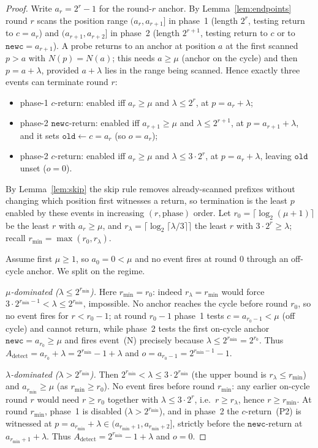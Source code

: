 \documentclass[11pt]{article}
\newcommand{\oldc}{\texttt{old}}
\newcommand{\newc}{\texttt{newc}}
\begin{document}
\begin{proof}
Write $a_r=2^{r}-1$ for the round-$r$ anchor. By Lemma~\ref{lem:endpoints} round
$r$ scans the position range $(a_r,a_{r+1}]$ in phase~1 (length $2^{r}$, testing
return to $c=a_r$) and $(a_{r+1},a_{r+2}]$ in phase~2 (length $2^{r+1}$, testing
return to $c$ or to $\newc=a_{r+1}$). A probe returns to an anchor at position
$a$ at the first scanned $p>a$ with $N(p)=N(a)$; this needs $a\ge\mu$ (anchor on
the cycle) and then $p=a+\lambda$, provided $a+\lambda$ lies in the range being
scanned. Hence exactly three events can terminate round $r$:
\begin{itemize}[leftmargin=2.4em,itemsep=1pt]
\item[\textup{(P1)}] phase-1 $c$-return: enabled iff $a_r\ge\mu$ and
      $\lambda\le 2^{r}$, at $p=a_r+\lambda$;
\item[\textup{(N)}] phase-2 $\newc$-return: enabled iff $a_{r+1}\ge\mu$ and
      $\lambda\le 2^{r+1}$, at $p=a_{r+1}+\lambda$, and it sets $\oldc\gets c=a_r$
      (so $o=a_r$);
\item[\textup{(P2)}] phase-2 $c$-return: enabled iff $a_r\ge\mu$ and
      $\lambda\le 3\cdot2^{r}$, at $p=a_r+\lambda$, leaving $\oldc$ unset ($o=0$).
\end{itemize}
By Lemma~\ref{lem:skip} the skip rule removes already-scanned prefixes without
changing which position first witnesses a return, so termination is the least $p$
enabled by these events in increasing $(r,\text{phase})$ order. Let
$r_0=\lceil\log_2(\mu+1)\rceil$ be the least $r$ with $a_r\ge\mu$, and
$r_\lambda=\lceil\log_2\lceil\lambda/3\rceil\rceil$ the least $r$ with
$3\cdot2^{r}\ge\lambda$; recall $r_{\min}=\max(r_0,r_\lambda)$.

Assume first $\mu\ge1$, so $a_0=0<\mu$ and no event fires at round $0$ through an
off-cycle anchor. We split on the regime.

\emph{$\mu$-dominated ($\lambda\le 2^{r_{\min}}$).} Here $r_{\min}=r_0$: indeed
$r_\lambda=r_{\min}$ would force $3\cdot2^{r_{\min}-1}<\lambda\le 2^{r_{\min}}$,
impossible. No anchor reaches the cycle before round $r_0$, so no event fires for
$r<r_0-1$; at round $r_0-1$ phase~1 tests $c=a_{r_0-1}<\mu$ (off cycle) and cannot
return, while phase~2 tests the first on-cycle anchor $\newc=a_{r_0}\ge\mu$ and
fires event~(N) precisely because $\lambda\le 2^{r_{\min}}=2^{r_0}$. Thus
$A_{\mathrm{detect}}=a_{r_0}+\lambda=2^{r_{\min}}-1+\lambda$ and
$o=a_{r_0-1}=2^{r_{\min}-1}-1$.

\emph{$\lambda$-dominated ($\lambda> 2^{r_{\min}}$).} Then
$2^{r_{\min}}<\lambda\le 3\cdot2^{r_{\min}}$ (the upper bound is
$r_\lambda\le r_{\min}$) and $a_{r_{\min}}\ge\mu$ (as $r_{\min}\ge r_0$). No event
fires before round $r_{\min}$: any earlier on-cycle round $r$ would need
$r\ge r_0$ together with $\lambda\le 3\cdot2^{r}$, i.e.\ $r\ge r_\lambda$, hence
$r\ge r_{\min}$. At round $r_{\min}$, phase~1 is disabled
($\lambda>2^{r_{\min}}$), and in phase~2 the $c$-return~(P2) is witnessed at
$p=a_{r_{\min}}+\lambda\in(a_{r_{\min}+1},a_{r_{\min}+2}]$, strictly before the
$\newc$-return at $a_{r_{\min}+1}+\lambda$. Thus
$A_{\mathrm{detect}}=2^{r_{\min}}-1+\lambda$ and $o=0$.


\end{proof}
\end{document}
